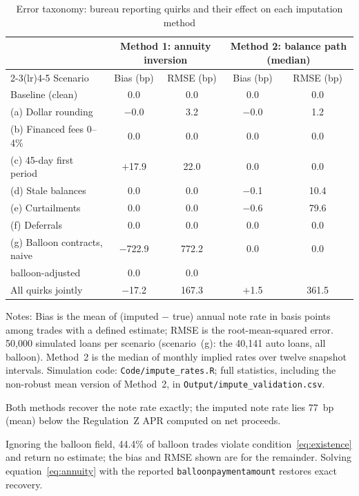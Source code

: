 \begin{table}[H]
\centering
\caption{Error taxonomy: bureau reporting quirks and their effect on each imputation method}
\label{tab:impute_taxonomy}
\begin{threeparttable}
\small
\begin{tabular}{lcccc}
\toprule
& \multicolumn{2}{c}{Method 1: annuity inversion} & \multicolumn{2}{c}{Method 2: balance path (median)} \\
\cmidrule(lr){2-3}\cmidrule(lr){4-5}
Scenario & Bias (bp) & RMSE (bp) & Bias (bp) & RMSE (bp) \\
\midrule
Baseline (clean)              & 0.0     & 0.0   & 0.0    & 0.0   \\
(a) Dollar rounding           & $-$0.0  & 3.2   & $-$0.0 & 1.2   \\
(b) Financed fees 0--4\%\tnote{a}      & 0.0     & 0.0   & 0.0    & 0.0   \\
(c) 45-day first period       & $+$17.9 & 22.0  & 0.0    & 0.0   \\
(d) Stale balances            & 0.0     & 0.0   & $-$0.1 & 10.4  \\
(e) Curtailments              & 0.0     & 0.0   & $-$0.6 & 79.6  \\
(f) Deferrals                 & 0.0     & 0.0   & 0.0    & 0.0   \\
(g) Balloon contracts, naive\tnote{b}  & $-$722.9 & 772.2 & 0.0 & 0.0 \\
\phantom{(g)} balloon-adjusted        & 0.0     & 0.0   &        &       \\
All quirks jointly\tnote{c}   & $-$17.2 & 167.3 & $+$1.5 & 361.5 \\
\bottomrule
\end{tabular}
\begin{tablenotes}\footnotesize
\item Notes: Bias is the mean of (imputed $-$ true) annual note rate in basis points among trades with a defined estimate; RMSE is the root-mean-squared error. 50{,}000 simulated loans per scenario (scenario~(g): the 40{,}141 auto loans, all balloon). Method~2 is the median of monthly implied rates over twelve snapshot intervals. Simulation code: \texttt{Code/impute\_rates.R}; full statistics, including the non-robust mean version of Method~2, in \texttt{Output/impute\_validation.csv}.
\item[a] Both methods recover the note rate exactly; the imputed note rate lies 77~bp (mean) below the Regulation~Z APR computed on net proceeds.
\item[b] Ignoring the balloon field, 44.4\% of balloon trades violate condition~\eqref{eq:existence} and return no estimate; the bias and RMSE shown are for the remainder. Solving equation~\eqref{eq:annuity} with the reported \texttt{balloon\allowbreak payment\allowbreak amount} restores exact recovery.

\end{tablenotes}
\end{threeparttable}
\end{table}
